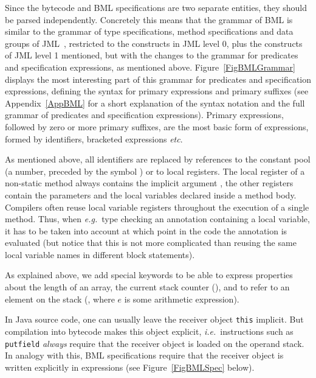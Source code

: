 Since the bytecode and BML specifications are two separate entities,
they should be parsed independently. Concretely this means that the
grammar of BML is similar to the grammar of type specifications,
method specifications and data groups of JML~\cite[\S A.5, A.6,
A.7]{JMLReferenceManual05}, restricted to the constructs in JML level
0, plus the constructs of JML level 1 mentioned, but with the changes
to the grammar for predicates and specification expressions, as
mentioned above. Figure~\ref{FigBMLGrammar} displays the most
interesting part of this grammar for predicates and specification
expressions, defining the syntax for primary expressions and primary
suffixes (see Appendix~\ref{AppBML} for a short explanation of the
syntax notation and the full grammar of predicates and specification
expressions). Primary expressions, followed by zero or more primary
suffixes, are the most basic form of expressions, formed by
identifiers, bracketed expressions
\emph{etc}. %

As mentioned above, all identifiers are replaced by references to the
constant pool (a number, preceded by the symbol
\jmlKey{\#}) or to local registers. The local register 
of a non-static method always contains the implicit argument
, the other registers contain the parameters and the
local variables declared inside a method body. Compilers often reuse
local variable registers throughout the execution of a single
method. Thus, when \emph{e.g.}\ type checking an annotation containing
a local variable, it has to be taken into account at which point in
the code the annotation is evaluated (but notice that this is not more
complicated than reusing the same local variable names in different
block statements). 

As explained above, we add special keywords to be able to express
properties about the length of an array, the current stack counter
(), and to refer to an element on the stack
(, where \(e\) is some arithmetic expression).

In Java source code, one can usually leave the receiver object
\texttt{this} implicit. But compilation into bytecode makes this
object explicit, \emph{i.e.}\ instructions such as \texttt{putfield}
\emph{always} require that the receiver object is loaded on the
operand stack. In analogy with this, BML specifications require that
the receiver object is written explicitly in expressions (see
Figure~\ref{FigBMLSpec} below). 

